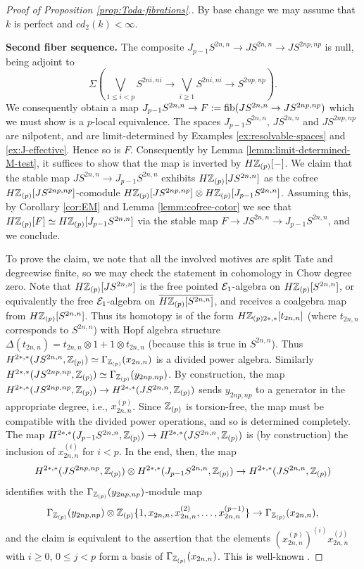 \documentclass{amsart}
\numberwithin{proposition}{section}
\numberwithin{equation}{section}
\begin{document}
\begin{proof}[Proof of Proposition \ref{prop:Toda-fibrations}.]
By base change we may assume that $k$ is perfect and $cd_2(k) < \infty$.

\textbf{Second fiber sequence.}
The composite $J_{p-1}S^{2n,n} \to J S^{2n,n} \to JS^{2np,np}$ is null, being adjoint to \[ \Sigma\left(\bigvee_{1 \le i < p} S^{2ni,ni} \to \bigvee_{i \ge 1} S^{2ni,ni} \to S^{2np,np}\right). \]
We consequently obtain a map $J_{p-1}S^{2n,n} \to F := \mathrm{fib}(J S^{2n,n} \to JS^{2np,np})$ which we must show is a $p$-local equivalence.
The spaces $J_{p-1} S^{2n,n}$, $J S^{2n,n}$ and $JS^{2np,np}$ are nilpotent, and are limit-determined by Examples \ref{ex:resolvable-spaces} and \ref{ex:J-effective}.
Hence so is $F$.
Consequently by Lemma \ref{lemm:limit-determined-M-test}, it suffices to show that the map is inverted by $H\mathbb{Z}_{(p)}[\mathord-]$.
We claim that the stable map $JS^{2n,n} \to J_{p-1}S^{2n,n}$ exhibits $H\mathbb{Z}_{(p)}[JS^{2n,n}]$ as the cofree $H\mathbb{Z}_{(p)}[JS^{2np,np}]$-comodule $H\mathbb{Z}_{(p)}[JS^{2np,np}] \otimes H\mathbb{Z}_{(p)}[J_{p-1}S^{2n,n}]$.
Assuming this, by Corollary \ref{cor:EM} and Lemma \ref{lemm:cofree-cotor} we see that $H\mathbb{Z}_{(p)}[F] \simeq H\mathbb{Z}_{(p)}[J_{p-1}S^{2n,n}]$ via the stable map $F \to J S^{2n,n} \to J_{p-1} S^{2n,n}$, and we conclude.

To prove the claim, we note that all the involved motives are split Tate and degreewise finite, so we may check the statement in cohomology in Chow degree zero.
Note that $H\mathbb{Z}_{(p)}[JS^{2n,n}]$ is the free pointed $\mathcal E_1$-algebra on $H\mathbb{Z}_{(p)}[S^{2n,n}]$, or equivalently the free $\mathcal E_1$-algebra on $\overline{H\mathbb{Z}_{(p)}[S^{2n,n}]}$, and receives a coalgebra map from $H\mathbb{Z}_{(p)}[S^{2n,n}]$.
Thus its homotopy is of the form $H\mathbb{Z}_{(p)2*,*}[t_{2n,n}]$ (where $t_{2n,n}$ corresponds to $S^{2n,n}$) with Hopf algebra structure $\Delta(t_{2n,n}) = t_{2n,n} \otimes 1 + 1 \otimes t_{2n,n}$ (because this is true in $S^{2n,n}$).
Thus $H^{2*,*}(JS^{2n,n}, \mathbb{Z}_{(p)}) \simeq \Gamma_{\mathbb{Z}_{(p)}}(x_{2n,n})$ is a divided power algebra.
Similarly $H^{2*,*}(JS^{2np,np}, \mathbb{Z}_{(p)}) \simeq \Gamma_{\mathbb{Z}_{(p)}}(y_{2np,np})$.
By construction, the map $H^{2*,*}(JS^{2np,np}, \mathbb{Z}_{(p)}) \to H^{2*,*}(JS^{2n,n}, \mathbb{Z}_{(p)})$ sends $y_{2np,np}$ to a generator in the appropriate degree, i.e., $x_{2n,n}^{(p)}$.
Since $\mathbb{Z}_{(p)}$ is torsion-free, the map must be compatible with the divided power operations, and so is determined completely.
The map $H^{2*,*}(J_{p-1}S^{2n,n}, \mathbb{Z}_{(p)}) \to H^{2*,*}(JS^{2n,n},\mathbb{Z}_{(p)})$ is (by construction) the inclusion of $x_{2n,n}^{(i)}$ for $i < p$.
In the end, then, the map \[ H^{2*,*}(JS^{2np,np}, \mathbb{Z}_{(p)}) \otimes H^{2*,*}(J_{p-1}S^{2n,n}, \mathbb{Z}_{(p)}) \to H^{2*,*}(JS^{2n,n}, \mathbb{Z}_{(p)}) \] identifies with the $\Gamma_{\mathbb{Z}_{(p)}}(y_{2np,np})$-module map \[ \Gamma_{\mathbb{Z}_{(p)}}(y_{2np,np}) \otimes \mathbb{Z}_{(p)}\{1, x_{2n,n}, x_{2n,n}^{(2)}, \dots, x_{2n,n}^{(p-1)}\} \to \Gamma_{\mathbb{Z}_{(p)}}(x_{2n,n}), \] and the claim is equivalent to the assertion that the elements $(x^{(p)}_{2n,n})^{(i)}x_{2n,n}^{(j)}$ with $i \ge 0$, $0 \le j < p$ form a basis of $\Gamma_{\mathbb{Z}_{(p)}}(x_{2n,n})$.
This is well-known \cite[Proposition~5.1.7]{neisendorfer-algebraic}.


\end{proof}
\end{document}
